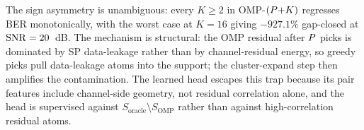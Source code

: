 \begin{table}[t]
\centering
\caption{Same-budget OMP-$(\Ppath{+}K)$: pooled BER (250 paired frames
per cell) and gap-closed against the physical-support
oracle. ``GC'' = $(\text{baseline}-\text{method})/(\text{baseline}-\text{oracle})$.
}
\label{tab:omp_ext}
\small
{}
\end{table}

The sign asymmetry is unambiguous: every $K\geq 2$ in OMP-$(\Ppath{+}K)$
regresses BER monotonically, with the worst case at $K{=}16$ giving
$-927.1\%$ gap-closed at $\mathrm{SNR}=20$~dB. The mechanism is structural: the
OMP residual after $P$ picks is dominated by SP data-leakage rather
than by channel-residual energy, so greedy picks pull data-leakage
atoms into the support; the cluster-expand step then amplifies the
contamination. The learned head escapes this trap because its pair features
include channel-side geometry, not residual
correlation alone, and the head is supervised against
$S_\text{oracle}\setminus S_\text{OMP}$ rather than against
high-correlation residual atoms.

